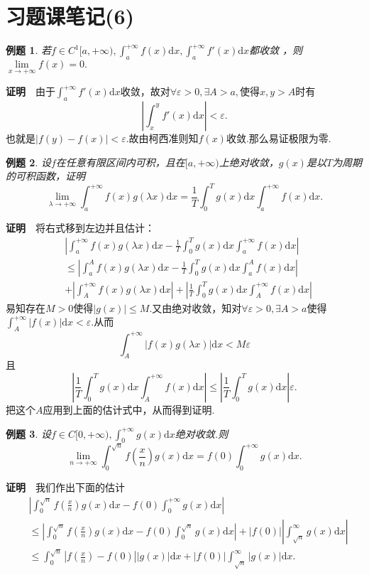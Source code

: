 \documentclass[UTF8]{article}
\newcommand{\dx}{\mathrm{d}x}
\newcommand{\zm}{\textbf{证明}$\quad$}
\newtheorem{exa}{\hspace{2em}例题}[section]
\begin{document}
\section{习题课笔记(6)}
\begin{exa}
  若$f\in C^1[a,+\infty),\int_a^{+\infty}f(x)\dx,\int_a^{+\infty}f'(x)\dx$都收敛
  ，则$\lim\limits_{x\to+\infty}f(x)=0.$
\end{exa}
\zm 由于$\int_a^{+\infty}f'(x)\dx$收敛，故对$\forall\varepsilon>0,\exists A>a,$使得$x,y>A$时有
$$\left|\int_x^yf'(x)\dx\right|<\varepsilon.$$
也就是$|f(y)-f(x)|<\varepsilon.$故由柯西准则知$f(x)$收敛.那么易证极限为零.
\begin{exa}
  设$f$在任意有限区间内可积，且在$[a,+\infty)$上绝对收敛，$g(x)$是以$T$为周期的可积函数，证明
  $$\lim_{\lambda\to+\infty}\int_a^{+\infty}f(x)g(\lambda x)\dx=\frac{1}{T}\int_0^Tg(x)\dx
  \int_a^{+\infty}f(x)\dx.$$
\end{exa}
\zm 将右式移到左边并且估计：
\begin{align*}
  &\left|\int_a^{+\infty}f(x)g(\lambda x)\dx-\frac{1}{T}\int_0^Tg(x)\dx\int_a^{+\infty}f(x)\dx\right|\\
  &\le\left|\int_a^Af(x)g(\lambda x)\dx-\frac{1}{T}\int_0^Tg(x)\dx\int_a^Af(x)\dx\right|\\
  &+\left|\int_A^{+\infty}f(x)g(\lambda x)\dx\right|+\left|\frac{1}{T}\int_0^Tg(x)\dx\int_A^{+\infty}f(x)\dx\right|
\end{align*}
易知存在$M>0$使得$|g(x)|\le M.$又由绝对收敛，知对$\forall \varepsilon>0,\exists A>a$使得$\int_A^{+\infty}|f(x)|
\dx<\varepsilon.$从而
$$\int_A^{+\infty}|f(x)g(\lambda x)|\dx<M\varepsilon$$
且
$$\left|\frac{1}{T}\int_0^Tg(x)\dx\int_A^{+\infty}f(x)\dx\right|\le\left|\frac{1}{T}\int_0^Tg(x)\dx\right|
\varepsilon.$$
把这个$A$应用到上面的估计式中，从而得到证明.
\begin{exa}
  设$f\in C[0,+\infty),\int_0^{+\infty}g(x)\dx$绝对收敛.则
  $$\lim_{n\to+\infty}\int_0^{\sqrt{n}}f(\frac{x}{n})g(x)\dx=f(0)\int_0^{+\infty}g(x)\dx.$$
\end{exa}
\zm 我们作出下面的估计
\begin{align*}
  &\left|\int_0^{\sqrt{n}}f(\frac{x}{n})g(x)\dx-f(0)\int_0^{+\infty}g(x)\dx\right|\\
  &\le\left|\int_0^{\sqrt{n}}f(\frac{x}{n})g(x)\dx-f(0)\int_0^{\sqrt{n}}g(x)\dx\right|+|f(0)|
  \left|\int_{\sqrt{n}}^{\infty}g(x)\dx\right|\\
  &\le\int_0^{\sqrt{n}}\left|f(\frac{x}{n})-f(0)\right| |g(x)|\dx+
  |f(0)|\int_{\sqrt{n}}^{\infty}|g(x)|\dx.
\end{align*}
\end{document}
